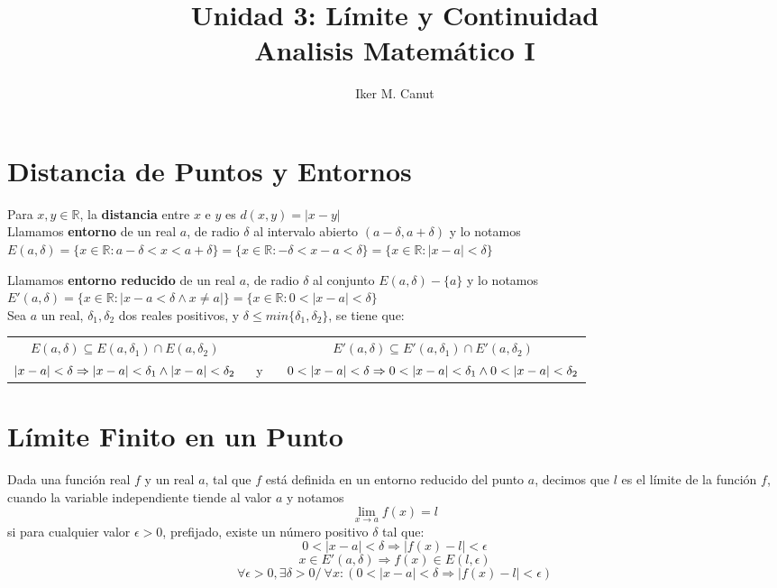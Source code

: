 \documentclass[11pt,a4paper]{article}
\author{Iker M. Canut}
\title{Unidad 3: L\'imite y Continuidad\\ Analisis Matem\'atico I}
\begin{document}
\maketitle
\newpage

\section{Distancia de Puntos y Entornos}
Para $x,y \in \mathbb{R}$, la \textbf{distancia} entre $x$ e $y$ es $d(x,y) = |x-y|$\\

Llamamos \textbf{entorno} de un real $a$, de radio $\delta$ al intervalo abierto $(a-\delta, a+\delta)$ y lo notamos\\ $E(a,\delta) = \{x\in\mathbb{R}:a-\delta<x<a+\delta\} = \{x\in\mathbb{R}:-\delta<x-a<\delta\} = \{x\in\mathbb{R}:|x-a|<\delta\}$

Llamamos \textbf{entorno reducido} de un real $a$, de radio $\delta$ al conjunto $E(a,\delta) - \{a\}$ y lo notamos $E'(a,\delta) = \{x\in\mathbb{R}:|x-a<\delta\land x\not = a|\} = \{x\in\mathbb{R}:0<|x-a|<\delta\}$\\

Sea $a$ un real, $\delta_1, \delta_2$ dos reales positivos, y $\delta\leq min\{\delta_1, \delta_2\}$, se tiene que:
\begin{table}[h]
\centering
\begin{tabular}{ccc}
$E(a,\delta) \subseteq E(a,\delta_1) \cap E(a,\delta_2)$ & \ \ \ \ & $E'(a,\delta) \subseteq E'(a,\delta_1) \cap E'(a,\delta_2)$\\
$|x-a|<\delta \Rightarrow |x-a|<\delta_1 \land |x-a|<\delta_2 \hfill$ & \ y \ & $\hfill 0<|x-a|<\delta \Rightarrow 0<|x-a|<\delta_1 \land 0<|x-a|<\delta_2$
\end{tabular}
\end{table}

\section{L\'imite Finito en un Punto}
Dada una funci\'on real $f$ y un real $a$, tal que $f$ est\'a definida en un entorno reducido del punto $a$, decimos que $l$ es el l\'imite de la funci\'on $f$, cuando la variable independiente tiende al valor $a$ y notamos $$\lim_{x\to a}f(x)=l$$ si para cualquier valor $\epsilon > 0$, prefijado, existe un n\'umero positivo $\delta$ tal que: $$0<|x-a|<\delta \Rightarrow |f(x)-l| < \epsilon$$ $$x \in E'(a, \delta) \Rightarrow f(x) \in E(l, \epsilon)$$ $$\forall \epsilon > 0, \exists \delta > 0 /\ \forall x : (0 < |x-a| < \delta \Rightarrow |f(x)-l|<\epsilon)$$\\
\end{document}
